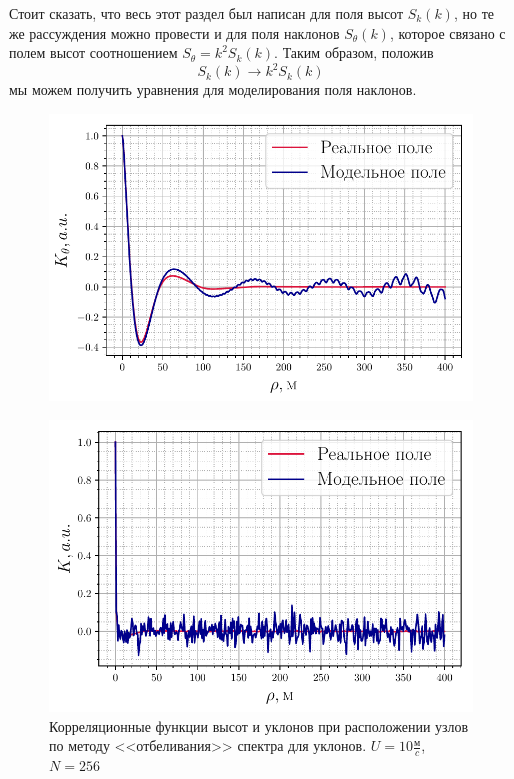 Стоит сказать, что весь этот раздел был написан для поля высот $S_k(k)$, но те же рассуждения можно провести и для поля наклонов $S_{\theta}(k)$, которое связано с полем высот соотношением $S_{\theta}=k^2 S_k(k)$. Таким образом, положив 
\begin{equation}
	S_k(k)\longrightarrow k^2 S_k(k)
\end{equation}
мы можем получить уравнения для моделирования поля наклонов. 

\begin{figure}[H]
	\begin{minipage}{0.49\linewidth}
			\centering
			\includegraphics[width=\linewidth]{fig/correlation_height_slopes2.pdf}
			\label{fig:ch21}		
	\end{minipage}
	\hfill
	\begin{minipage}{0.49\linewidth}
			\centering
			\includegraphics[width=\linewidth]{fig/correlation_angles_slopes2.pdf}
	\end{minipage}
	\caption{Корреляционные функции высот и уклонов при расположении узлов по методу <<отбеливания>> спектра для уклонов. $U=10 \frac{\text{м}}{c}$, $N=256$}
			\label{fig:ca21}		
\end{figure}



